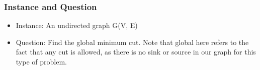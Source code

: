 \documentclass{beamer}
\begin{document}

\begin{frame}
%
%		
%
%
\frametitle{Instance and Question}
\begin{itemize}
		\item Instance: An undirected graph G(V, E)
		\item Question: Find the global minimum cut. Note that global here refers to the fact that any cut is allowed, as there is no sink or source in our graph for this type of problem.
\end{itemize}
\end{frame}
\end{document}
